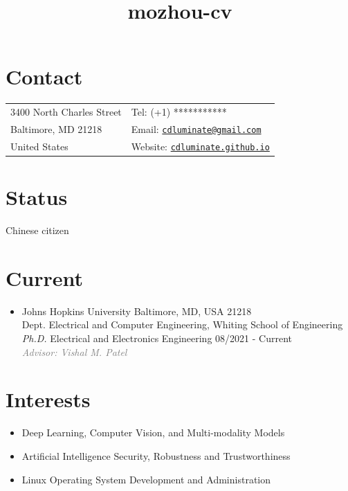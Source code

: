 \documentclass[10pt,margin,line,pifont,palatino,courier]{res}
\newcommand{\email}[1]{\href{mailto:#1}{\tt #1}}
\begin{document}
\title{mozhou-cv}
\begin{resume}

\section{\sc Contact}

\vspace{.05in}
\begin{tabular}{@{}p{2.2in}p{2.2in}}
3400 North Charles Street & Tel: (+1) *********** \\
Baltimore, MD 21218       & Email: {\small\email{cdluminate@gmail.com}}\\
United States             & Website: {\small\href{https://cdluminate.github.io/}{\tt cdluminate.github.io}}
\end{tabular}

\section{\sc Status}
Chinese citizen

\section{\sc Current}

\begin{itemize}[leftmargin=*]
\item Johns Hopkins University \hfill Baltimore, MD, USA 21218\\
    Dept. Electrical and Computer Engineering, Whiting School of Engineering\\
    \textit{Ph.D.} Electrical and Electronics Engineering \hfill 08/2021 - Current\\
    \textcolor{gray}{\small\it Advisor: Vishal M. Patel}
\end{itemize}

\section{\sc Interests}
\begin{itemize}[noitemsep, leftmargin=*]
    \item Deep Learning, Computer Vision, and Multi-modality Models
    \item Artificial Intelligence Security, Robustness and Trustworthiness
    \item Linux Operating System Development and Administration
\end{itemize}
 

\end{resume}
\end{document}
